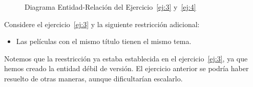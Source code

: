 \begin{ejercicio}
\begin{figure}
        \caption{Diagrama Entidad-Relación del Ejercicio~\ref{ej:3} y~\ref{ej:4}}
        \label{fig:ej3}
    \end{figure}

\end{ejercicio}

\begin{ejercicio} \label{ej:4}
    Considere el ejercicio~\ref{ej:3} y la siguiente restricción adicional:
    \begin{itemize}
        \item Las películas con el mismo título tienen el mismo tema.
    \end{itemize}

    Notemos que la reestricción ya estaba establecida en el ejercicio~\ref{ej:3}, ya que hemos creado la entidad débil de versión.
    El ejercicio anterior se podría haber resuelto de otras maneras, aunque dificultarían escalarlo.

\end{ejercicio}

